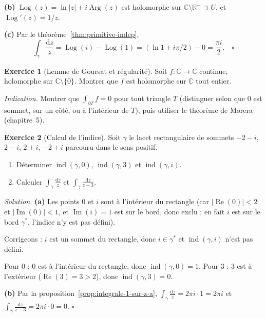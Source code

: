 \documentclass[12pt,a4paper,openany]{book}
\theoremstyle{definition}
\newtheorem{exercice}{Exercice}[chapter]
\theoremstyle{plain}
\theoremstyle{remark}
\newcommand{\C}{\mathbb{C}}
\newcommand{\R}{\mathbb{R}}
\DeclareMathOperator{\re}{Re}
\DeclareMathOperator{\im}{Im}
\DeclareMathOperator{\Arg}{Arg}
\DeclareMathOperator{\Log}{Log}
\DeclareMathOperator{\ind}{ind}
\newcommand{\dd}{\mathrm{d}}
\newcommand{\abs}[1]{\left|#1\right|}
\begin{document}
\textbf{(b)} $\Log(z) = \ln\abs{z} + i\Arg(z)$ est holomorphe sur
$\C \setminus \R^- \supset U$, et $\Log'(z) = 1/z$.

\textbf{(c)} Par le théorème~\ref{thm:primitive-indep},
\[
  \int_\gamma \frac{\dd z}{z} = \Log(i) - \Log(1)
  = (\ln 1 + i\pi/2) - 0 = \frac{\pi i}{2}. \quad\square
\]

\bigskip

\begin{exercice}[Lemme de Goursat et régularité]\label{exo:goursat-application}
Soit $f \colon \C \to \C$ continue, holomorphe sur $\C \setminus \{0\}$.
Montrer que $f$ est holomorphe sur $\C$ tout entier.

\noindent\textit{Indication.} Montrer que $\int_{\partial T} f = 0$ pour tout
triangle $T$ (distinguer selon que $0$ est sommet, sur un côté, ou à
l'intérieur de $T$), puis utiliser le théorème de Morera (chapitre~5).
\end{exercice}

\bigskip

\begin{exercice}[Calcul de l'indice]\label{exo:calcul-indice}
Soit $\gamma$ le lacet rectangulaire de sommets $-2-i$, $2-i$, $2+i$, $-2+i$
parcouru dans le sens positif.
\begin{enumerate}[label=\textup{(\alph*)}]
  \item Déterminer $\ind(\gamma, 0)$, $\ind(\gamma, 3)$ et $\ind(\gamma, i)$.
  \item Calculer $\displaystyle\int_\gamma \frac{\dd z}{z}$ et
    $\displaystyle\int_\gamma \frac{\dd z}{z-3}$.
\end{enumerate}
\end{exercice}

\noindent\textit{Solution.}\enspace
\textbf{(a)} Les points $0$ et $i$ sont à l'intérieur du rectangle
(car $\abs{\re(0)} < 2$ et $\abs{\im(0)} < 1$, et $\im(i) = 1$ est sur le
bord, donc exclu ; en fait $i$ est sur le bord $\gamma^*$, l'indice n'y est
pas défini).

Corrigeons : $i$ est un sommet du rectangle, donc $i \in \gamma^*$ et
$\ind(\gamma, i)$ n'est pas défini.

Pour $0$ : $0$ est à l'intérieur du rectangle, donc $\ind(\gamma, 0) = 1$.
Pour $3$ : $3$ est à l'extérieur ($\re(3) = 3 > 2$), donc
$\ind(\gamma, 3) = 0$.

\textbf{(b)} Par la proposition~\ref{prop:integrale-1-sur-z-a},
$\int_\gamma \frac{\dd z}{z} = 2\pi i \cdot 1 = 2\pi i$ et
$\int_\gamma \frac{\dd z}{z-3} = 2\pi i \cdot 0 = 0$. \hfill$\square$
\end{document}
